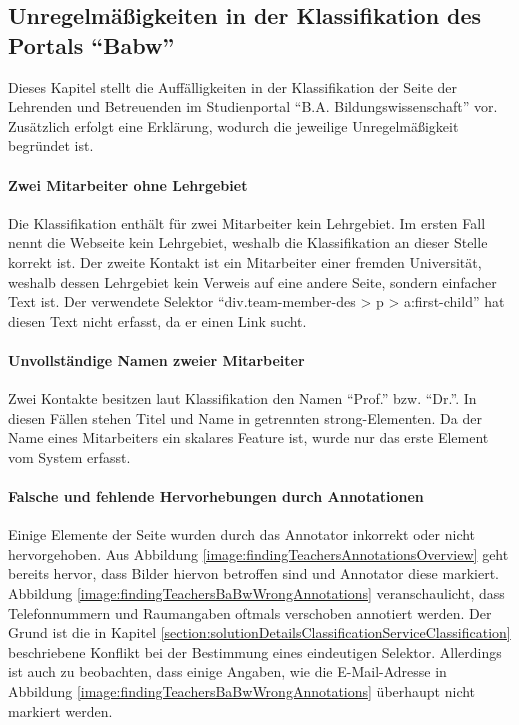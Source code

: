 \subsection{Unregelmäßigkeiten in der Klassifikation des Portals "`Babw"'}
    \label{section:findingsTeachersAbnormalitiesBabw}
    Dieses Kapitel stellt die Auffälligkeiten in der Klassifikation
    der Seite der Lehrenden und Betreuenden im Studienportal
    "`B.A. Bildungswissenschaft"' vor.
    Zusätzlich erfolgt eine Erklärung,
    wodurch die jeweilige Unregelmäßigkeit begründet ist.

    \paragraph{Zwei Mitarbeiter ohne Lehrgebiet}
    Die Klassifikation enthält für zwei Mitarbeiter kein Lehrgebiet.
    Im ersten Fall nennt die Webseite kein Lehrgebiet,
    weshalb die Klassifikation an dieser Stelle korrekt ist.
    Der zweite Kontakt ist ein Mitarbeiter einer fremden Universität,
    weshalb dessen Lehrgebiet kein Verweis auf eine andere Seite,
    sondern einfacher Text ist.
    Der verwendete Selektor "`div.team-member-des > p > a:first-child"'
    hat diesen Text nicht erfasst, da er einen Link sucht.

    \paragraph{Unvollständige Namen zweier Mitarbeiter}
    Zwei Kontakte besitzen laut Klassifikation den Namen "`Prof."' bzw. "`Dr."'.
    In diesen Fällen stehen Titel und Name in getrennten strong-Elementen.
    Da der Name eines Mitarbeiters ein skalares Feature ist,
    wurde nur das erste Element vom System erfasst.

    \paragraph{Falsche und fehlende Hervorhebungen durch Annotationen}
    Einige Elemente der Seite wurden durch das Annotator inkorrekt oder nicht hervorgehoben.
    Aus Abbildung \ref{image:findingTeachersAnnotationsOverview} geht bereits hervor,
    dass Bilder hiervon betroffen sind und Annotator diese markiert.
    Abbildung \ref{image:findingTeachersBaBwWrongAnnotations}
    veranschaulicht, dass Telefonnummern und Raumangaben oftmals verschoben annotiert werden.
    Der Grund ist die in Kapitel \ref{section:solutionDetailsClassificationServiceClassification}
    beschriebene Konflikt bei der Bestimmung eines eindeutigen Selektor.
    Allerdings ist auch zu beobachten, dass einige Angaben,
    wie die E-Mail-Adresse in Abbildung \ref{image:findingTeachersBaBwWrongAnnotations}
    überhaupt nicht markiert werden.

